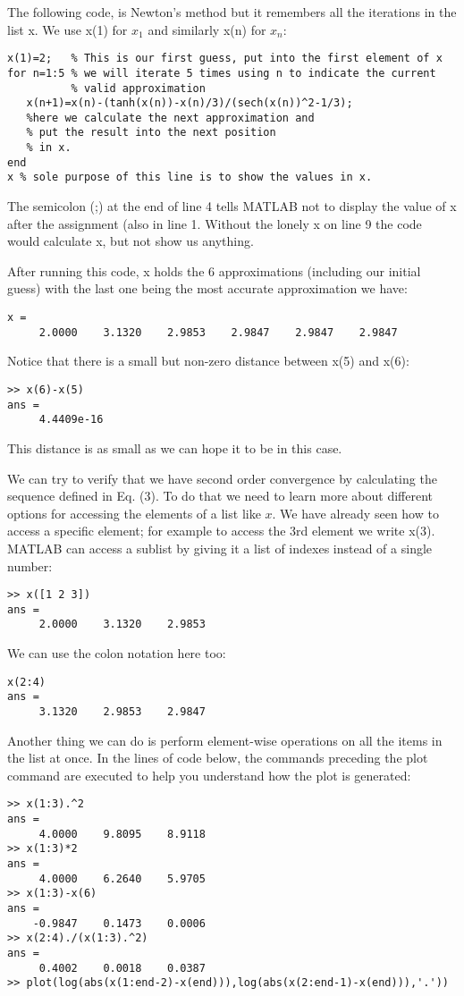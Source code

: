 \documentclass[a4paper,12pt]{article}
\begin{document}
The following code, is Newton's method but it remembers all the iterations in the list x. We use x(1) for \(x_1\) and similarly x(n) for \(x_n\):

\begin{verbatim}
x(1)=2;   % This is our first guess, put into the first element of x
for n=1:5 % we will iterate 5 times using n to indicate the current
          % valid approximation
   x(n+1)=x(n)-(tanh(x(n))-x(n)/3)/(sech(x(n))^2-1/3);  
   %here we calculate the next approximation and
   % put the result into the next position
   % in x.
end
x % sole purpose of this line is to show the values in x.
\end{verbatim}

The semicolon (;) at the end of line 4 tells MATLAB not to display the value of x after the assignment (also in line 1. Without the lonely x on line 9 the code would calculate x, but not show us anything.

After running this code, x holds the 6 approximations (including our initial guess) with the last one being the most accurate approximation we have:

\begin{verbatim}
x =
     2.0000    3.1320    2.9853    2.9847    2.9847    2.9847
\end{verbatim}
Notice that there is a small but non-zero distance between x(5) and x(6):

\begin{verbatim}
>> x(6)-x(5)
ans =
     4.4409e-16
\end{verbatim}
This distance is as small as we can hope it to be in this case.

We can try to verify that we have second order convergence by calculating the sequence defined in Eq. (3). To do that we need to learn more about different options for accessing the elements of a list like \(x\). We have already seen how to access a specific element; for example to access the 3rd element we write x(3). MATLAB can access a sublist by giving it a list of indexes instead of a single number:

\begin{verbatim}
>> x([1 2 3])
ans =
     2.0000    3.1320    2.9853
\end{verbatim}
We can use the colon notation here too:

\begin{verbatim}
x(2:4)
ans =
     3.1320    2.9853    2.9847
\end{verbatim}
Another thing we can do is perform element-wise operations on all the items in the list at once. In the lines of code below, the commands preceding the plot command are executed to help you understand how the plot is generated:
\begin{verbatim}
>> x(1:3).^2
ans =
     4.0000    9.8095    8.9118
>> x(1:3)*2
ans =
     4.0000    6.2640    5.9705
>> x(1:3)-x(6)
ans =
    -0.9847    0.1473    0.0006
>> x(2:4)./(x(1:3).^2)
ans =
     0.4002    0.0018    0.0387
>> plot(log(abs(x(1:end-2)-x(end))),log(abs(x(2:end-1)-x(end))),'.'))
\end{verbatim}
\end{document}

